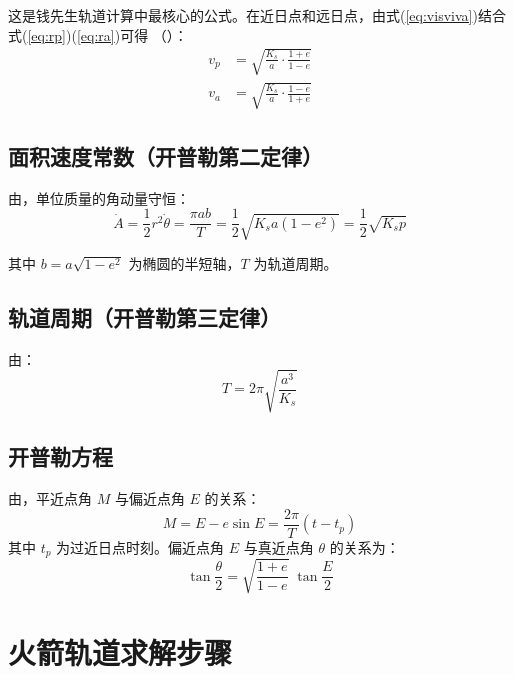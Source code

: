 \documentclass[UTF8,12pt,a4paper]{ctexart}
\begin{document}
这是钱先生轨道计算中最核心的公式。在近日点和远日点，由式(\ref{eq:visviva})结合式(\ref{eq:rp})(\ref{eq:ra})可得
（\cite[\S6.2, 式(6.6)--(6.7)]{qian2008}）：
\begin{align}
    v_p &= \sqrt{\frac{K_s}{a} \cdot \frac{1+e}{1-e}} \label{eq:vp} \\
    v_a &= \sqrt{\frac{K_s}{a} \cdot \frac{1-e}{1+e}} \label{eq:va}
\end{align}

\subsection{面积速度常数（开普勒第二定律）}

由\cite[\S6.2, 式(6.5)]{qian2008}，单位质量的角动量守恒：
\begin{equation}\label{eq:areal}
    \dot{A} = \frac{1}{2} r^2 \dot{\theta} = \frac{\pi a b}{T}
    = \frac{1}{2}\sqrt{K_s a(1-e^2)} = \frac{1}{2}\sqrt{K_s p}
\end{equation}

其中 $b = a\sqrt{1-e^2}$ 为椭圆的半短轴\cite[\S6.2, 式(6.3)]{qian2008}，$T$ 为轨道周期。

\subsection{轨道周期（开普勒第三定律）}

由\cite[\S5.4, 式(5.15); \S6.2, 式(6.4)]{qian2008}：
\begin{equation}\label{eq:period}
    T = 2\pi\sqrt{\frac{a^3}{K_s}}
\end{equation}

\subsection{开普勒方程}

由\cite[\S5.4, pp.~111]{qian2008}，平近点角 $M$ 与偏近点角 $E$ 的关系：
\begin{equation}\label{eq:kepler}
    M = E - e\sin E = \frac{2\pi}{T}(t - t_p)
\end{equation}
其中 $t_p$ 为过近日点时刻。偏近点角 $E$ 与真近点角 $\theta$ 的关系为：
\begin{equation}\label{eq:EtoTheta}
    \tan\frac{\theta}{2} = \sqrt{\frac{1+e}{1-e}}\;\tan\frac{E}{2}
\end{equation}

\section{火箭轨道求解步骤}
\end{document}

